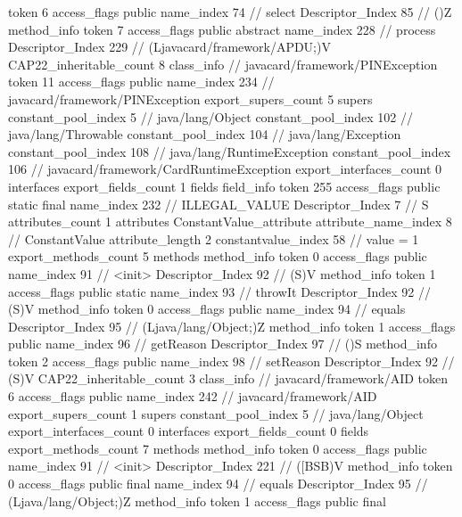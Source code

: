 {{{{{					token	6
					access_flags	public
					name_index	74		// select
					Descriptor_Index	85		// ()Z
				}
				method_info {
					token	7
					access_flags	public abstract
					name_index	228		// process
					Descriptor_Index	229		// (Ljavacard/framework/APDU;)V
				}
			}
			CAP22_inheritable_count	8
		}
		class_info {		// javacard/framework/PINException
			token	11
			access_flags	public
			name_index	234		// javacard/framework/PINException
			export_supers_count	5
			supers {
				constant_pool_index	5		// java/lang/Object
				constant_pool_index	102		// java/lang/Throwable
				constant_pool_index	104		// java/lang/Exception
				constant_pool_index	108		// java/lang/RuntimeException
				constant_pool_index	106		// javacard/framework/CardRuntimeException
			}
			export_interfaces_count	0
			interfaces {
			}
			export_fields_count	1
			fields {
			field_info {
				token	255
				access_flags	public static final
				name_index	232		// ILLEGAL_VALUE
				Descriptor_Index	7		// S
				attributes_count	1
				attributes {
				ConstantValue_attribute {
					attribute_name_index	8		// ConstantValue
					attribute_length	2
					constantvalue_index	58		// value = 1
				}
				}
			}
			}
			export_methods_count	5
			methods {
				method_info {
					token	0
					access_flags	public
					name_index	91		// <init>
					Descriptor_Index	92		// (S)V
				}
				method_info {
					token	1
					access_flags	public static
					name_index	93		// throwIt
					Descriptor_Index	92		// (S)V
				}
				method_info {
					token	0
					access_flags	public
					name_index	94		// equals
					Descriptor_Index	95		// (Ljava/lang/Object;)Z
				}
				method_info {
					token	1
					access_flags	public
					name_index	96		// getReason
					Descriptor_Index	97		// ()S
				}
				method_info {
					token	2
					access_flags	public
					name_index	98		// setReason
					Descriptor_Index	92		// (S)V
				}
			}
			CAP22_inheritable_count	3
		}
		class_info {		// javacard/framework/AID
			token	6
			access_flags	public
			name_index	242		// javacard/framework/AID
			export_supers_count	1
			supers {
				constant_pool_index	5		// java/lang/Object
			}
			export_interfaces_count	0
			interfaces {
			}
			export_fields_count	0
			fields {
			}
			export_methods_count	7
			methods {
				method_info {
					token	0
					access_flags	public
					name_index	91		// <init>
					Descriptor_Index	221		// ([BSB)V
				}
				method_info {
					token	0
					access_flags	public final
					name_index	94		// equals
					Descriptor_Index	95		// (Ljava/lang/Object;)Z
				}
				method_info {
					token	1
					access_flags	public final
}}}}}
